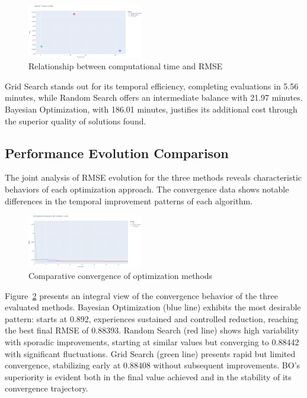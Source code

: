 \documentclass[conference]{IEEEtran}
\begin{document}
\begin{figure}[htbp]
  \centering
  \includegraphics[width=0.45\textwidth]{fig_tradeoff.png}
  \caption{Relationship between computational time and RMSE}
  \label{fig:tradeoff}
\end{figure}

Grid Search stands out for its temporal efficiency, completing evaluations in 5.56 minutes, while Random Search offers an intermediate balance with 21.97 minutes. Bayesian Optimization, with 186.01 minutes, justifies its additional cost through the superior quality of solutions found.

\subsection{Performance Evolution Comparison}

The joint analysis of RMSE evolution for the three methods reveals characteristic behaviors of each optimization approach. The convergence data shows notable differences in the temporal improvement patterns of each algorithm.

\begin{figure}[htbp]
  \centering
  \includegraphics[width=0.45\textwidth]{fig_bo_vs_random_vs_grid.png}
  \caption{Comparative convergence of optimization methods}
  \label{fig:comparacion}
\end{figure}

Figure~\ref{fig:comparacion} presents an integral view of the convergence behavior of the three evaluated methods. Bayesian Optimization (blue line) exhibits the most desirable pattern: starts at 0.892, experiences sustained and controlled reduction, reaching the best final RMSE of 0.88393. Random Search (red line) shows high variability with sporadic improvements, starting at similar values but converging to 0.88442 with significant fluctuations. Grid Search (green line) presents rapid but limited convergence, stabilizing early at 0.88408 without subsequent improvements. BO's superiority is evident both in the final value achieved and in the stability of its convergence trajectory.
\end{document}
